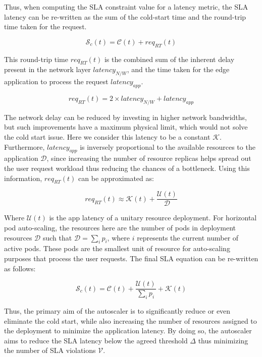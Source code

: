 Thus, when computing the SLA constraint value for a latency metric, the SLA latency can be re-written as the sum of the cold-start time and the round-trip time taken for the request.

\begin{equation}
    \mathcal{S}_{c}(t) = \mathcal{C}(t) + req_{RT}(t)
\end{equation}


This round-trip time $req_{RT}(t)$ is the combined sum of the inherent delay present in the network layer $latency_{N/W}$, and the time taken for the edge application to process the request $latency_{app}$.

\begin{equation}
    req_{RT}(t) = 2 \times latency_{N/W} + latency_{app}
\end{equation}

The network delay can be reduced by investing in higher network bandwidths, but such improvements have a maximum physical limit, which would not solve the cold start issue. Here we consider this latency to be a constant $\mathcal{K}$. Furthermore, $latency_{app}$ is inversely proportional to the available resources to the application $\mathcal{D}$, since increasing the number of resource replicas helps spread out the user request workload thus reducing the chances of a bottleneck. Using this information, $req_{RT}(t)$ can be approximated as:

\begin{equation}
    req_{RT}(t) \approx \mathcal{K}(t) + \frac{\mathcal{U}(t)}{\mathcal{D}}
\end{equation}

Where $\mathcal{U}(t)$ is the app latency of a unitary resource deployment. For horizontal pod auto-scaling, the resources here are the number of pods in deployment resources $\mathcal{D}$ such that $\mathcal{D} = \sum_{i} p_{i}$, where $i$ represents the current number of active pods. These pods are the smallest unit of resource for auto-scaling purposes that process the user requests. The final SLA equation can be re-written as follows:

\begin{equation}
    \mathcal{S}_{c}(t) = \mathcal{C}(t) + \frac{\mathcal{U}(t)}{\sum_{i} p_{i}} + \mathcal{K}(t)
    \label{eqn:sla-cold-start}
\end{equation}

Thus, the primary aim of the autoscaler is to significantly reduce or even eliminate the cold start, while also increasing the number of resources assigned to the deployment to minimize the application latency. By doing so, the autoscaler aims to reduce the SLA latency below the agreed threshold $\Delta$ thus minimizing the number of SLA violations $\mathcal{V}$.\par

